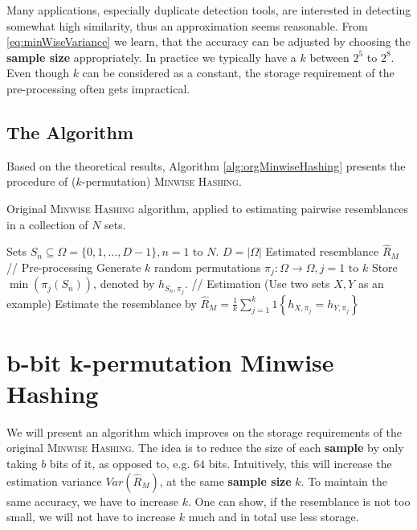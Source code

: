 \documentclass[a4paper]{article}
\begin{document}
Many applications, especially duplicate detection tools, are interested in detecting somewhat high similarity, thus an approximation seems reasonable. From \vref{eq:minWiseVariance} we learn, that the accuracy can be adjusted by choosing the \textbf{sample size} appropriately. In practice we typically have a $k$ between $2^5$ to $2^8$. Even though $k$ can be considered as a constant, the storage requirement of the pre-processing often gets impractical.



\subsection{The Algorithm}

Based on the theoretical results, Algorithm \vref{alg:orgMinwiseHashing} presents the procedure of ($k$-permutation) \textsc{Minwise Hashing}.

\begin{algorithm}[H]
\caption{Original \textsc{Minwise Hashing} algorithm, applied to estimating pairwise resemblances in a collection of $N$ sets.}
\label{alg:orgMinwiseHashing}
\begin{algorithmic}
\Require Sets $S_n \subseteq \Omega = \{0,1,\ldots,D-1\}, n = 1 \text{ to } N$. \Comment $D = \left| \Omega \right|$
\Ensure Estimated resemblance $\hat{R}_M$
\State // Pre-processing
\State Generate $k$ random permutations $\pi_j: \Omega\longrightarrow\Omega, j=1\text{ to }k$
	\State Store $\min(\pi_j(S_n))$, denoted by $h_{S_n,\pi_j}$.
\EndFor
\State
\State // Estimation (Use two sets $X,Y$ as an example)
\State Estimate the resemblance by $\hat{R}_M=\frac{1}{k}\sum_{j=1}^k 1 \left\lbrace h_{X,\pi_j}=h_{Y,\pi_j} \right\rbrace$
\end{algorithmic}
\end{algorithm}





\section{b-bit k-permutation Minwise Hashing}\label{sec:b-bitMinwiseHashing}

We will present an algorithm which improves on the storage requirements of the original \textsc{Minwise Hashing}. The idea is to reduce the size of each \textbf{sample} by only taking $b$ bits of it, as opposed to, e.g. $64$ bits. Intuitively, this will increase the estimation variance $Var(\hat{R}_M)$, at the same \textbf{sample size} $k$. To maintain the same accuracy, we have to increase $k$. One can show, if the resemblance is not too small, we will not have to increase $k$ much and in total use less storage.
\end{document}
